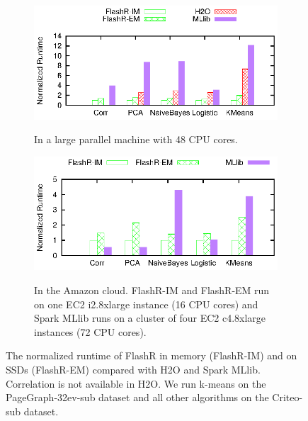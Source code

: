 \begin{figure}
  \vspace{-5pt}
	\centering
	\footnotesize
	\begin{subfigure}{.5\textwidth}
		\includegraphics{FlashMatrix_figs/FlashR-vs-dist.eps}
		\label{perf:para}
		\caption{In a large parallel machine with 48 CPU cores.}
	\end{subfigure}

	\vspace{3pt}
	\begin{subfigure}{.5\textwidth}
		\includegraphics{FlashMatrix_figs/FlashR-vs-dist-EC2.eps}
		\label{perf:cloud}
		\caption{In the Amazon cloud. FlashR-IM and FlashR-EM run on one
			EC2 i2.8xlarge instance (16 CPU cores) and Spark MLlib runs
		on a cluster of four EC2 c4.8xlarge instances (72 CPU cores).}
	\end{subfigure}
	\vspace{-8pt}
	\caption{The normalized runtime of FlashR in memory (FlashR-IM) and
	on SSDs (FlashR-EM) compared with H2O and Spark MLlib. Correlation is not
	available in H2O. We run k-means on the PageGraph-32ev-sub dataset and
	all other algorithms on the Criteo-sub dataset.}
	\label{perf:rt}
  \vspace{-10pt}
\end{figure}

